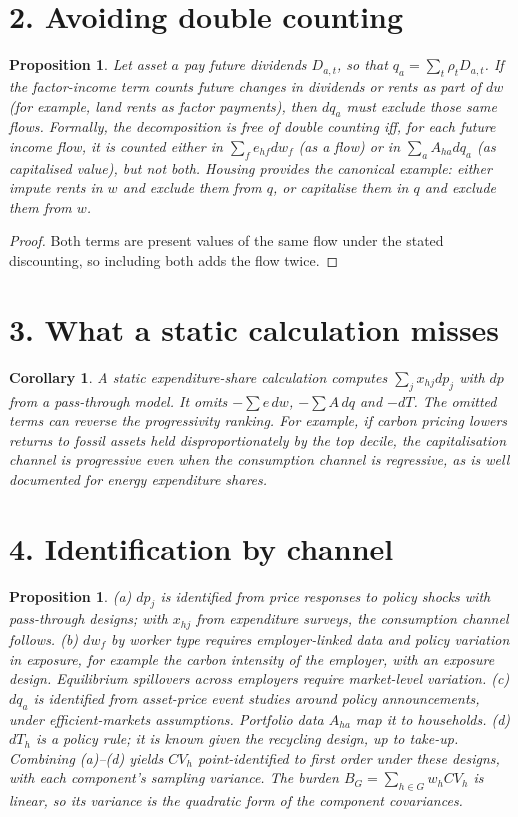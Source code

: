 \documentclass[11pt]{article}
\newtheorem{proposition}[theorem]{Proposition}
\newtheorem{corollary}[theorem]{Corollary}
\theoremstyle{definition}
\begin{document}
\section*{2. Avoiding double counting}
\begin{proposition}\label{prop:double}
Let asset $a$ pay future dividends $D_{a,t}$, so that $q_a=\sum_t\rho_tD_{a,t}$. If the factor-income term counts future
changes in dividends or rents as part of $dw$ (for example, land rents as factor payments), then $dq_a$ must exclude those
same flows. Formally, the decomposition is free of double counting iff, for each future income flow, it is counted either in
$\sum_fe_{hf}dw_f$ (as a flow) or in $\sum_aA_{ha}dq_a$ (as capitalised value), but not both. Housing provides the canonical
example: either impute rents in $w$ and exclude them from $q$, or capitalise them in $q$ and exclude them from $w$.
\end{proposition}
\begin{proof}
Both terms are present values of the same flow under the stated discounting, so including both adds the flow twice.
\end{proof}

\section*{3. What a static calculation misses}
\begin{corollary}
A static expenditure-share calculation computes $\sum_jx_{hj}dp_j$ with $dp$ from a pass-through model. It omits
$-\sum e\,dw$, $-\sum A\,dq$ and $-dT$. The omitted terms can reverse the progressivity ranking. For example, if carbon pricing
lowers returns to fossil assets held disproportionately by the top decile, the capitalisation channel is progressive even when
the consumption channel is regressive, as is well documented for energy expenditure shares.
\end{corollary}

\section*{4. Identification by channel}
\begin{proposition}\label{prop:id}
(a) $dp_j$ is identified from price responses to policy shocks with pass-through designs; with $x_{hj}$ from expenditure
surveys, the consumption channel follows.
(b) $dw_f$ by worker type requires employer-linked data and policy variation in exposure, for example the carbon intensity
of the employer, with an exposure design. Equilibrium spillovers across employers require market-level variation.
(c) $dq_a$ is identified from asset-price event studies around policy announcements, under efficient-markets assumptions.
Portfolio data $A_{ha}$ map it to households.
(d) $dT_h$ is a policy rule; it is known given the recycling design, up to take-up.
Combining (a)--(d) yields $CV_h$ point-identified to first order under these designs, with each component's sampling
variance. The burden $B_G=\sum_{h\in G}w_hCV_h$ is linear, so its variance is the quadratic form of the component
covariances.
\end{proposition}
\end{document}
